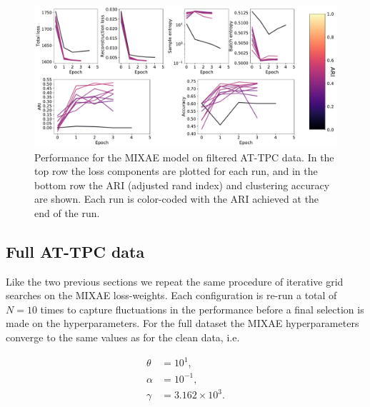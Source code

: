 \begin{figure}[H]
\centering
\includegraphics[width=\textwidth]{./plots/clean_mixae.pdf}
\caption{Performance for the MIXAE model on filtered AT-TPC data. In the top row the loss components are plotted for each run, and in the bottom row the ARI (adjusted rand index) and clustering accuracy are shown. Each run is color-coded with the ARI achieved at the end of the run.}\label{fig:mixae_clean}
\end{figure}


\subsection{Full AT-TPC data}

Like the two previous sections we repeat the same procedure of iterative grid searches on the MIXAE loss-weights. Each configuration is re-run a total of $N=10$ times to capture fluctuations in the performance before a final selection is made on the hyperparameters. For the full dataset the MIXAE hyperparameters converge to the same values as for the clean data, i.e. 


\begin{align}
\theta &= 10^{1}, \\
\alpha &= 10^{-1}, \\
\gamma &= 3.162\times 10^3.
\end{align}